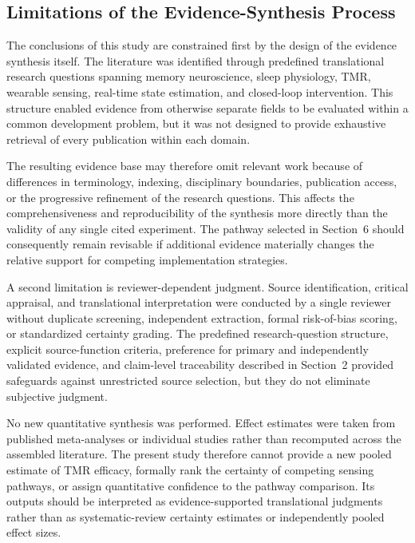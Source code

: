 \subsection{Limitations of the Evidence-Synthesis Process}

The conclusions of this study are constrained first by the design of the
evidence synthesis itself. The literature was identified through predefined
translational research questions spanning memory neuroscience, sleep
physiology, TMR, wearable sensing, real-time state estimation, and closed-loop
intervention. This structure enabled evidence from otherwise separate fields to
be evaluated within a common development problem, but it was not designed to
provide exhaustive retrieval of every publication within each domain.

The resulting evidence base may therefore omit relevant work because of
differences in terminology, indexing, disciplinary boundaries, publication
access, or the progressive refinement of the research questions. This affects
the comprehensiveness and reproducibility of the synthesis more directly than
the validity of any single cited experiment. The pathway selected in Section~6
should consequently remain revisable if additional evidence materially changes
the relative support for competing implementation strategies.

A second limitation is reviewer-dependent judgment. Source identification,
critical appraisal, and translational interpretation were conducted by a single
reviewer without duplicate screening, independent extraction, formal
risk-of-bias scoring, or standardized certainty grading. The predefined
research-question structure, explicit source-function criteria, preference for
primary and independently validated evidence, and claim-level traceability
described in Section~2 provided safeguards against unrestricted source
selection, but they do not eliminate subjective judgment.

No new quantitative synthesis was performed. Effect estimates were taken from
published meta-analyses or individual studies rather than recomputed across the
assembled literature. The present study therefore cannot provide a new pooled
estimate of TMR efficacy, formally rank the certainty of competing sensing
pathways, or assign quantitative confidence to the pathway comparison. Its
outputs should be interpreted as evidence-supported translational judgments
rather than as systematic-review certainty estimates or independently pooled
effect sizes.


